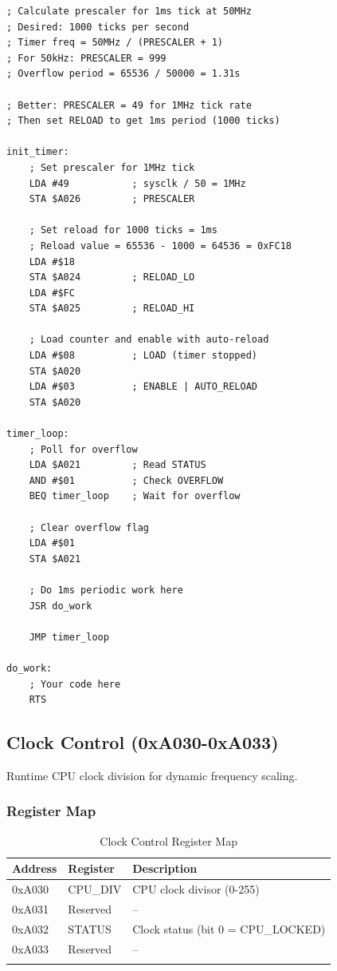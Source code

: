 \documentclass[11pt,a4paper]{article}
\begin{document}
\begin{lstlisting}[language=asm6502, caption=1ms periodic timer at 50MHz]
; Calculate prescaler for 1ms tick at 50MHz
; Desired: 1000 ticks per second
; Timer freq = 50MHz / (PRESCALER + 1)
; For 50kHz: PRESCALER = 999
; Overflow period = 65536 / 50000 = 1.31s

; Better: PRESCALER = 49 for 1MHz tick rate
; Then set RELOAD to get 1ms period (1000 ticks)

init_timer:
    ; Set prescaler for 1MHz tick
    LDA #49           ; sysclk / 50 = 1MHz
    STA $A026         ; PRESCALER

    ; Set reload for 1000 ticks = 1ms
    ; Reload value = 65536 - 1000 = 64536 = 0xFC18
    LDA #$18
    STA $A024         ; RELOAD_LO
    LDA #$FC
    STA $A025         ; RELOAD_HI

    ; Load counter and enable with auto-reload
    LDA #$08          ; LOAD (timer stopped)
    STA $A020
    LDA #$03          ; ENABLE | AUTO_RELOAD
    STA $A020

timer_loop:
    ; Poll for overflow
    LDA $A021         ; Read STATUS
    AND #$01          ; Check OVERFLOW
    BEQ timer_loop    ; Wait for overflow

    ; Clear overflow flag
    LDA #$01
    STA $A021

    ; Do 1ms periodic work here
    JSR do_work

    JMP timer_loop

do_work:
    ; Your code here
    RTS
\end{lstlisting}

\subsection{Clock Control (0xA030-0xA033)}

Runtime CPU clock division for dynamic frequency scaling.

\subsubsection{Register Map}

\begin{longtable}{lll}
\toprule
\textbf{Address} & \textbf{Register} & \textbf{Description} \\
\midrule
\endhead
0xA030 & CPU\_DIV & CPU clock divisor (0-255) \\
0xA031 & Reserved & -- \\
0xA032 & STATUS & Clock status (bit 0 = CPU\_LOCKED) \\
0xA033 & Reserved & -- \\
\bottomrule
\caption{Clock Control Register Map}
\end{longtable}
\end{document}
